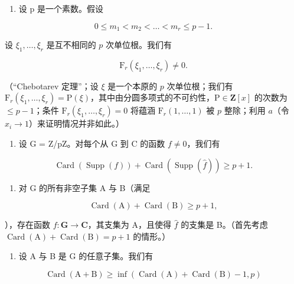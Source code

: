 \begin{enumerate}
\def\labelenumi{\alph{enumi})}
\setcounter{enumi}{2}
\tightlist
\item
  设 p 是一个素数。假设
\end{enumerate}

\[
0 \leqslant m _ {1} <   m _ {2} <   \dots <   m _ {r} \leqslant p - 1.
\]

设 \(\xi_{1},\ldots,\xi_{r}\) 是互不相同的 \(p\) 次单位根。我们有

\[
\mathrm{F} _ {r} (\xi_ {1}, \ldots , \xi_ {r}) \neq 0.
\]

（“Chebotarev 定理”；设 \(\xi\) 是一个本原的 \(p\) 次单位根；我们有 \(\mathrm{F}_r(\xi_1, \ldots, \xi_r) = \mathrm{P}(\xi)\)，其中由分圆多项式的不可约性，\(\mathrm{P} \in \mathbf{Z}[x]\) 的次数为 \(\leqslant p - 1\)；条件 \(\mathrm{F}_r(\xi_1, \ldots, \xi_r) = 0\) 将蕴涵 \(\mathrm{F}_r(1, \ldots, 1)\) 被 \(p\) 整除；利用 \(a\)（令 \(x_i \to 1\)）来证明情况并非如此。）

\begin{enumerate}
\def\labelenumi{\alph{enumi})}
\setcounter{enumi}{3}
\tightlist
\item
  设 G = Z/pZ。对每个从 G 到 C 的函数 \(f \neq 0\)，我们有
\end{enumerate}

\[
\operatorname{Card} (\operatorname{Supp} (f)) + \operatorname{Card} (\operatorname{Supp} (\widehat {f})) \geqslant p + 1.
\]

\begin{enumerate}
\def\labelenumi{\alph{enumi})}
\setcounter{enumi}{4}
\tightlist
\item
  对 G 的所有非空子集 A 与 B（满足
\end{enumerate}

\[
\operatorname{Card} (\mathrm{A}) + \operatorname{Card} (\mathrm{B}) \geqslant p + 1,
\]

），存在函数 \(f \colon \mathbf{G} \to \mathbf{C}\)，其支集为 A，且使得 \(\widehat{f}\) 的支集是 B。（首先考虑 \(\operatorname{Card}(\mathrm{A}) + \operatorname{Card}(\mathrm{B}) = p + 1\) 的情形。）

\begin{enumerate}
\def\labelenumi{\alph{enumi})}
\setcounter{enumi}{5}
\tightlist
\item
  设 A 与 B 是 G 的任意子集。我们有
\end{enumerate}

\[
\operatorname{Card} (\mathrm{A} + \mathrm{B}) \geqslant \inf (\operatorname{Card} (\mathrm{A}) + \operatorname{Card} (\mathrm{B}) - 1, p)
\]

